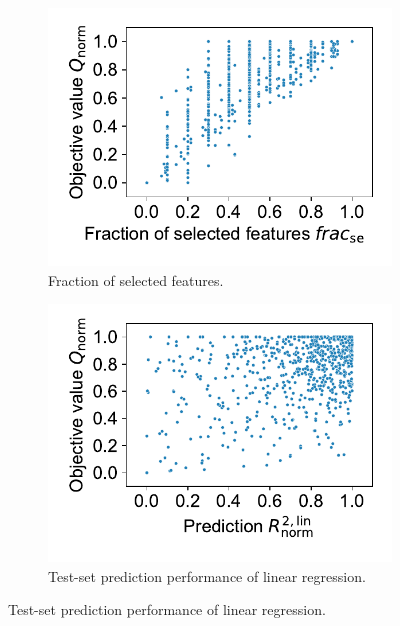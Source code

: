\begin{figure}[t]
	\centering
	\begin{subfigure}{0.48\textwidth}
		\centering
		\includegraphics[width=\textwidth, trim=15 15 15 10, clip]{plots/syn-selected-vs-objective.pdf}
		\caption{Fraction of selected features.}
		\label{fig:syn:selected-vs-objective}
	\end{subfigure}
	\hfill
	\begin{subfigure}{0.48\textwidth}
		\centering
		\includegraphics[width=\textwidth, trim=15 15 15 10, clip]{plots/syn-frac-linear-regression-r2-vs-objective.pdf}
		\caption{Test-set prediction performance of linear regression.}
		\label{fig:syn:frac-linear-regression-r2-vs-objective}
	\end{subfigure}

\end{figure}
